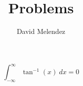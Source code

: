 \documentclass[12pt]{article}
\begin{document}
\title{Problems}
\author{David Melendez}
\maketitle

\begin{equation*}
  \int_{-\infty}^{\infty} \tan^{-1}(x)\ dx = 0
\end{equation*}
\end{document}
